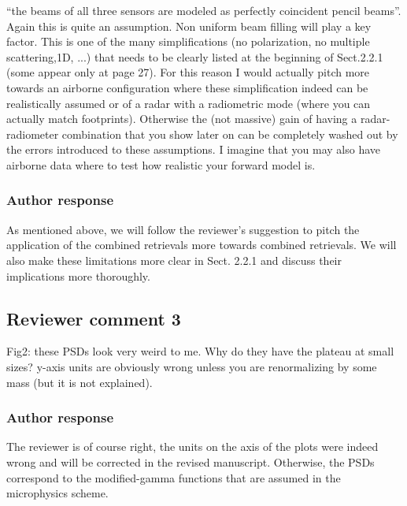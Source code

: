 \documentclass[11pt]{scrartcl}
\begin{document}
 “the beams of all three sensors are modeled as perfectly coincident pencil
beams”. Again this is quite an assumption. Non uniform beam filling will play a
key factor. This is one of the many simplifications (no polarization, no multiple
scattering,1D, ...) that needs to be clearly listed at the beginning of
Sect.2.2.1 (some appear only at page 27). For this reason I would actually pitch
more towards an airborne configuration where these simplification indeed can
be realistically assumed or of a radar with a radiometric mode (where you can
actually match footprints). Otherwise the (not massive) gain of having a
radar-radiometer combination that you show later on can be completely washed
out by the errors introduced to these assumptions. I imagine that you may also
have airborne data where to test how realistic your forward model is.

\subsubsection*{Author response}


As mentioned above, we will follow the reviewer's suggestion to pitch the application
of the combined retrievals more towards combined retrievals. We will also make these
limitations more clear in Sect. 2.2.1 and discuss their implications more thoroughly.

\subsection*{Reviewer comment 3}
Fig2: these PSDs look very weird to me. Why do they have the plateau at small
sizes? y-axis units are obviously wrong unless you are renormalizing by some mass
(but it is not explained).

\subsubsection*{Author response}

The reviewer is of course right, the units on the axis of the plots were indeed
wrong and will be corrected in the revised manuscript. Otherwise, the PSDs
correspond to the modified-gamma functions that are assumed in the
\cite{milbrandtyau05} microphysics scheme.
\end{document}
